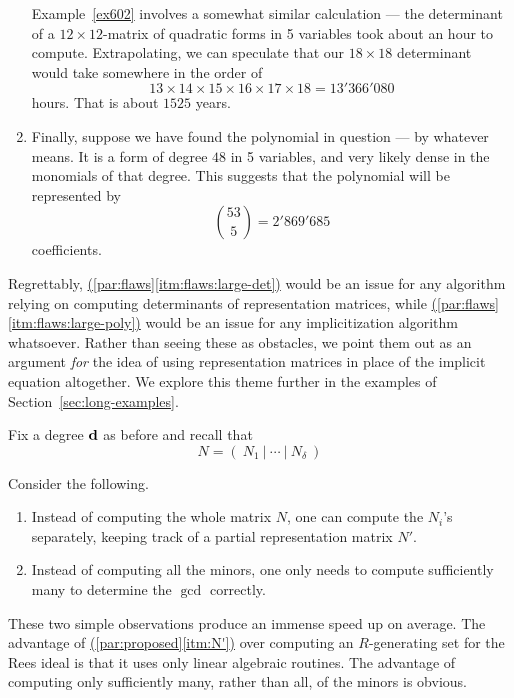 \documentclass[fleqn,reqno]{amsart}
\renewcommand{\itmref}[2]{{\normalfont\hyperref[#1]{(\ref*{#2}\ref*{#1})}}}
\begin{document}
\begin{paragraf}
\begin{enumerate}
Example~\ref{ex602} involves a somewhat similar calculation ---
the determinant of a $12\times12$-matrix of quadratic forms in 5 variables
took about an hour to compute.
Extrapolating, we can speculate that our $18\times18$ determinant would take somewhere
in the order of
\[
	13\times14\times15\times16\times17\times18=13'366'080
\]
hours.
That is about $1525$ years.

\item
\label{itm:flaws:large-poly}
Finally, suppose we have found the polynomial in question --- by whatever means.
It is a form of degree $48$ in 5 variables, and very likely dense in the monomials of that degree.
This suggests that the polynomial will be represented by
\[
	\binom{53}{5}=2'869'685
\]
coefficients.
\end{enumerate}
\end{paragraf}

\begin{paragraf*}
Regrettably,
\itmref{itm:flaws:large-det}{par:flaws} would be an issue for any algorithm
relying on computing determinants of representation matrices,
while \itmref{itm:flaws:large-poly}{par:flaws}
would be an issue for any implicitization algorithm whatsoever.
Rather than seeing these as obstacles,
we point them out as an argument {\em for} the idea of using
representation matrices in place of the implicit equation altogether.
We explore this theme further in the examples of Section~\ref{sec:long-examples}.
\end{paragraf*}

\begin{paragraf}
\label{par:proposed}
Fix a degree $\mathbf d$ as before and recall that
\[
	N=(~N_1~|~\cdots~|~N_\delta~)
\]

Consider the following.
\begin{enumerate}
\item
\label{itm:N'}
Instead of computing the whole matrix $N$, one can compute the $N_i$'s separately,
keeping track of a partial representation matrix $N'$.
\item
\label{itm:gcd}
Instead of computing all the minors, one only needs to compute sufficiently many to determine
the $\gcd$ correctly.
\end{enumerate}
\end{paragraf}

\begin{paragraf*}
These two simple observations produce an immense speed up on average.
The advantage of \itmref{itm:N'}{par:proposed} over computing an $R$-generating set for the
Rees ideal is that it uses only linear algebraic routines.
The advantage of computing only sufficiently many, rather than all, of the minors is obvious.
\end{paragraf*}
\end{document}
